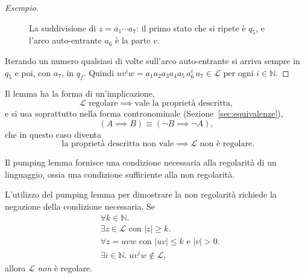 \documentclass[a4paper, 11pt, oneside]{book}
\theoremstyle{formale}
\newenvironment{esempio}
    {\begin{proof}[\textit{Esempio}]\renewcommand{\qedsymbol}{$\diamond$}}
    {\end{proof}}
\begin{document}
\begin{esempio}
\begin{figure}[H]
            \caption{La suddivisione di $z = a_1 \cdots a_7$: il primo stato che si ripete
                \`e $q_5$, e l'arco auto-entrante $a_6$ \`e la parte $v$.}
            \label{fig:pumping-esempio}
        \end{figure}

        Iterando un numero qualsiasi di volte sull'arco auto-entrante si arriva sempre
        in $q_5$ e poi, con $a_7$, in $q_f$. Quindi
        $uv^i w = a_1 a_2 a_3 a_4 a_5 \, a_6^i \, a_7 \in \mathcal{L}$ per ogni
        $i \in \mathbb{N}$.
    \end{esempio}

    Il lemma ha la forma di un'implicazione,
    \begin{equation*}
        \mathcal{L} \text{ regolare} \implies \text{vale la propriet\`a descritta},
    \end{equation*}
    e si usa soprattutto nella forma contronominale (Sezione~\ref{sec:equivalenze}),
    \begin{equation*}
        (A \implies B) \equiv (\neg B \implies \neg A),
    \end{equation*}
    che in questo caso diventa
    \begin{equation*}
        \text{ la propriet\`a descritta non vale} \implies
        \mathcal{L} \text{ non \`e regolare}.
    \end{equation*}

    Il pumping lemma fornisce una condizione necessaria alla regolarit\`a di un linguaggio,
    ossia una condizione sufficiente alla non regolarit\`a.

    L'utilizzo del pumping lemma per dimostrare la non regolarit\`a richiede la negazione
    della condizione necessaria. Se
    \begin{align*}
        & \forall k \in \mathbb{N}. \\
        & \exists z \in \mathcal{L} \text{ con } |z| \geq k. \\
        & \forall z = uvw \text{ con } |uv| \leq k \text{ e } |v| > 0. \\
        & \exists i \in \mathbb{N}.\; uv^i w \notin \mathcal{L},
    \end{align*}
    allora $\mathcal{L}$ \emph{non} \`e regolare.
\end{document}
